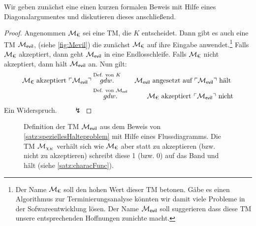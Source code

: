 Wir geben zunächst eine einen kurzen formalen Beweis mit Hilfe eines Diagonalargumentes
und diskutieren dieses anschließend.
\begin{proof}
  Angenommen $\mathcal{M}_\text{€}$ sei eine \ac{TM}, die $K$ entscheidet.
  Dann gibt es auch eine \ac{TM} $\mathcal{M}_\textsf{evil}$, (siehe \autoref{fig:Mevil})
  die zunächst $\mathcal{M}_\text{€}$ auf ihre Eingabe anwendet.\footnote{
  Der Name $\mathcal{M}_\text{€}$ soll den hohen Wert dieser \ac{TM} betonen.
  Gäbe es einen Algorithmus zur Terminierungsanalyse könnten wir damit viele Probleme in der Sofwareentwicklung lösen.
  Der Name $\mathcal{M}_\textsf{evil}$ soll suggerieren dass diese \ac{TM} unsere entsprechenden Hoffnungen zunichte macht.
  }
  Falls $\mathcal{M}_\text{€}$ akzeptiert, dann geht $\mathcal{M}_\textsf{evil}$ in eine Endlosschleife. 
  Falls $\mathcal{M}_\text{€}$ nicht akzeptiert, dann hält $\mathcal{M}_\textsf{evil}$ an. Nun gilt:
  \begin{eqnarray*}
  \mathcal{M}_\text{€} \text{ akzeptiert } \ulcorner \mathcal{M}_\textsf{evil} \urcorner 
  &\stackrel{\text{Def. von } K}{gdw.} & \mathcal{M}_\textsf{evil} \text{ angesetzt auf } \ulcorner \mathcal{M}_\textsf{evil} \urcorner \text{ hält }\\
  &\stackrel{\text{Def. von } \mathcal{M}_\textsf{evil}}{gdw.} & \mathcal{M}_\text{€} \text{ akzeptiert } \ulcorner \mathcal{M}_\textsf{evil} \urcorner \text{ nicht}
  \end{eqnarray*}
  Ein Widerspruch. $\qquad\lightning$
\end{proof}

 \begin{figure}[H]\centering
  \caption{Definition der \ac{TM} $\mathcal{M}_\textsf{evil}$ aus dem Beweis von \autoref{satz:speziellesHalteproblem} mit Hilfe eines Flussdiagramms.
  Die \ac{TM} $\mathcal{M}_{\chi_K}$ verhält sich wie $\mathcal{M}_\text{€}$ aber statt zu akzeptieren (bzw. nicht zu akzeptieren) schreibt diese 1 (bzw. 0) auf das Band und hält (siehe \autoref{satz:characFunc}).}
  \label{fig:Mevil}
 \end{figure}




